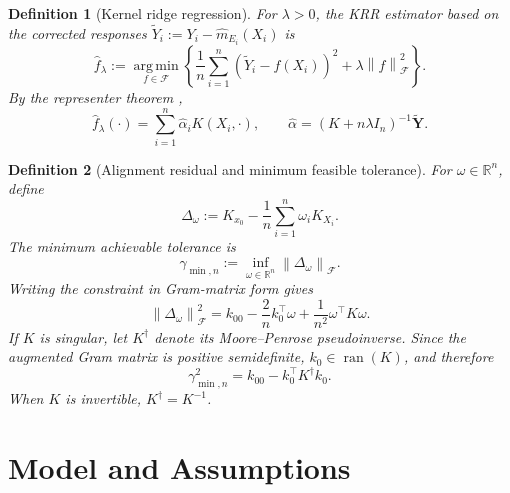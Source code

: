 \documentclass[11pt]{article}
\newtheorem{definition}{Definition}[section]
\newcommand{\R}{\mathbb{R}}
\newcommand{\F}{\mathcal{F}}
\newcommand{\ran}{\operatorname{ran}}
\newcommand{\argmin}{\operatorname*{arg\,min}}
\newcommand{\norm}[1]{\left\lVert #1\right\rVert}
\begin{document}
\begin{definition}[Kernel ridge regression]
For $\lambda>0$, the KRR estimator based on the corrected responses $\widetilde Y_i:=Y_i-\widehat m_{E_i}(X_i)$ is
\begin{equation}
  \widehat f_\lambda
  :=\argmin_{f\in\F}
  \left\{
    \frac1n\sum_{i=1}^n(\widetilde Y_i-f(X_i))^2+\lambda\norm{f}_{\F}^2
  \right\}.
  \label{eq:krr_definition}
\end{equation}
By the representer theorem \cite{wahba1990spline,kimeldorf1971some},
\[
  \widehat f_\lambda(\cdot)=\sum_{i=1}^n\widehat\alpha_iK(X_i,\cdot),\qquad
  \widehat\alpha=(K+n\lambda I_n)^{-1}\widetilde{\bm Y}.
\]
\end{definition}

\begin{definition}[Alignment residual and minimum feasible tolerance]
For $\omega\in\R^n$, define
\[
  \Delta_\omega
  :=K_{x_0}-\frac1n\sum_{i=1}^n\omega_iK_{X_i}.
\]
The minimum achievable tolerance is
\[
  \gamma_{\min,n}:=\inf_{\omega\in\R^n}\norm{\Delta_\omega}_{\F}.
\]
Writing the constraint in Gram-matrix form gives
\begin{equation}
  \norm{\Delta_\omega}_{\F}^2
  =k_{00}-\frac2n k_0^\top\omega+\frac1{n^2}\omega^\top K\omega.
  \label{eq:alignment_gram_form}
\end{equation}
If $K$ is singular, let $K^\dagger$ denote its Moore--Penrose pseudoinverse. Since the augmented Gram matrix is positive semidefinite, $k_0\in\ran(K)$, and therefore
\begin{equation}
  \gamma_{\min,n}^2=k_{00}-k_0^\top K^\dagger k_0.
  \label{eq:gamma_min_closed}
\end{equation}
When $K$ is invertible, $K^\dagger=K^{-1}$.
\end{definition}

\section{Model and Assumptions}
\end{document}
